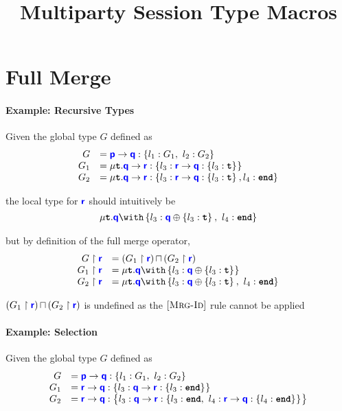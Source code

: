 \documentclass{article}
\title{Multiparty Session Type Macros}
\begin{document}
\maketitle

\section{Full Merge}

\paragraph{Example: Recursive Types}
Given the global type $G$ defined as
\[
\begin{array}{rl}
G &= \gcomm{p}{q}{l_1: G_1,~l_2: G_2}{} \\
G_1 &= \tyrec{\gcomm{q}{r}{l_3: \gcomm{r}{q}{l_3: \tyrecvar}{}}{}} \\
G_2 &= \tyrec{\gcomm{q}{r}{l_3: \gcomm{r}{q}{l_3: \tyrecvar}{}, l_4: \tyend}{}}
\end{array}
\]

the local type for $\role{r}$ should intuitively be
\[
\tyrec{
\tybra{q}{l_3: \tysel{q}{l_3: \tyrecvar}{},~l_4: \tyend}{}
}
\]

but by definition of the full merge operator,
\[
\begin{array}{rl}
\proj{G}{r} &= \tymerge{\left(\proj{G_1}{r}\right)}{\left(\proj{G_2}{r}\right)} \\
\proj{G_1}{r} &= \tyrec{\tybra{q}{l_3: \tysel{q}{l_3: \tyrecvar}{}}{}} \\
\proj{G_2}{r} &= \tyrec{\tybra{q}{l_3: \tysel{q}{l_3: \tyrecvar}{},~l_4: \tyend}{}}
\end{array}
\]

$\tymerge{\left(\proj{G_1}{r}\right)}{\left(\proj{G_2}{r}\right)}$ is undefined as the $\rulename{Mrg-Id}$ rule
cannot be applied

\paragraph{Example: Selection}
Given the global type $G$ defined as
\[
\begin{array}{rl}
G &= \gcomm{p}{q}{l_1: G_1,~l_2: G_2}{} \\
G_1 &= \gcomm{r}{q}{l_3: \gcomm{q}{r}{l_3: \tyend}{}}{} \\
G_2 &= \gcomm{r}{q}{l_3: \gcomm{q}{r}{l_3: \tyend,~l_4: \gcomm{r}{q}{l_4: \tyend}{}}{}}{}
\end{array}
\]
\end{document}
